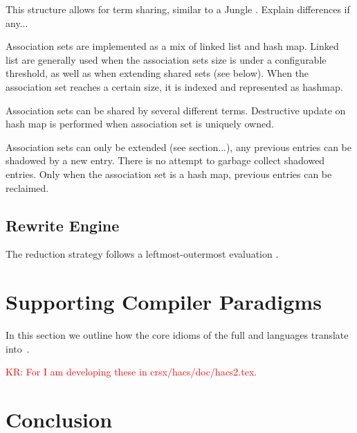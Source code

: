 \documentclass[letterpaper,11pt]{article}
\newcommand{\KR}[1]{\textcolor{red}{KR: #1}}
\begin{document}
This structure allows for term sharing, similar to a Jungle \cite{Hoffmann91implementingterm}. Explain differences if any...

\begin{structure}
  Association sets are implemented as a mix of linked list and hash map. Linked list are generally used when the association sets size is under a
  configurable threshold, as well as when extending shared sets (see below). When the association set reaches a certain size, it is indexed 
  and represented as hashmap. 
  
  Association sets can be shared by several different terms. Destructive update on hash map is performed when association set is uniquely owned. 
  
  Association sets can only be extended (see section...), any previous entries can be shadowed by a new entry. There is no attempt to
  garbage collect shadowed entries. Only when the association set is a hash map, previous entries can be reclaimed.
  
\end{structure}

\subsection{Rewrite Engine}

The reduction strategy follows a leftmost-outermost evaluation \cite{Toyama05reductionstrategies}. 
 




\section{Supporting Compiler Paradigms}
\label{sec:compiling}

In this section we outline how the core idioms of the full \CRSX and \HAX languages translate
into~\hax.

\KR{For \HAX I am developing these in crsx/hacs/doc/hacs2.tex.}



\section{Conclusion}
\label{sec:conc}
\end{document}
